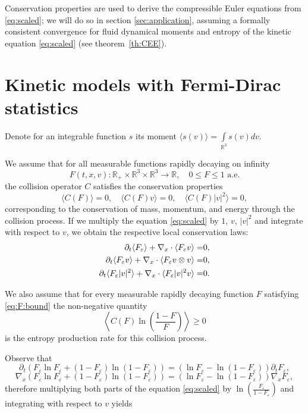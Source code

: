 Conservation properties  are used to derive the compressible Euler equations from \eqref{eq:scaled}; we will do so in section \ref{sec:application}, assuming a formally consistent convergence for fluid dynamical moments and entropy of the kinetic equation \eqref{eq:scaled} (see theorem~\ref{th:CEE}).

\section{Kinetic models with Fermi-Dirac statistics} %
\label{sec:kinetic_models}
Denote for an integrable function $s$ its moment $\langle s(v)\rangle = \int\limits_{\mathbb R^3}s(v)dv$. 

We assume that for all measurable functions rapidly decaying on infinity \begin{equation}\label{eq:F:bound}
	F(t,x,v): \mathbb R_+\times \mathbb R^3\times  \mathbb R^3\to \mathbb R,\quad  0\le F\le 1 \mbox { a.e.}
\end{equation}
the collision operator $C$ satisfies the conservation properties 
\begin{equation}\label{eq:C:conserv}\langle C(F)\rangle = 0, \quad \langle C(F)v\rangle = 0,\quad \langle
C(F)|v|^2\rangle = 0,
\end{equation}
corresponding to  the conservation of mass, momentum, and energy through the collision process. If we multiply the equation \eqref{eq:scaled} by $1$, $v$, $|v|^2$ and integrate with respect to $v$, we obtain the respective 
local conservation laws:
\begin{align}\label{eq:conserv}
\partial_t \langle F_\varepsilon \rangle +\nabla_x \cdot \langle F_\varepsilon v \rangle=&0,\notag\\
\partial_t \langle F_\varepsilon v \rangle +\nabla_x \cdot \langle F_\varepsilon v\otimes v \rangle=&0,\\
\partial_t \langle F_\varepsilon |v|^2\rangle +\nabla_x \cdot \langle F_\varepsilon |v|^2v \rangle=&0\notag.
\end{align}

We also assume that for every measurable rapidly decaying function $F$ satisfying \eqref{eq:F:bound} the non-negative quantity 
\begin{equation}\label{eq:entropy}
 \left\langle
C(F )\ln\left(\frac{1-F }{F}\right)\right\rangle \ge0
\end{equation}
is the entropy production rate for this collision process.

Observe that 
\[\partial_t (F_\varepsilon \ln F_\varepsilon+(1-F_\varepsilon )\ln(1-F_\varepsilon )) = ( \ln F_\varepsilon - \ln(1-F_\varepsilon ))\partial_t F_\varepsilon ,\]
\[\nabla_x (F_\varepsilon \ln F_\varepsilon +(1-F_\varepsilon )\ln(1-F_\varepsilon )) = ( \ln F_\varepsilon - \ln(1-F_\varepsilon )) \nabla_x F_\varepsilon ,\]
therefore multiplying both parts of the equation \eqref{eq:scaled} by $\ln\left(\frac{F_\varepsilon}{1-F_\varepsilon }\right)$ and integrating with respect to $v$ yields

